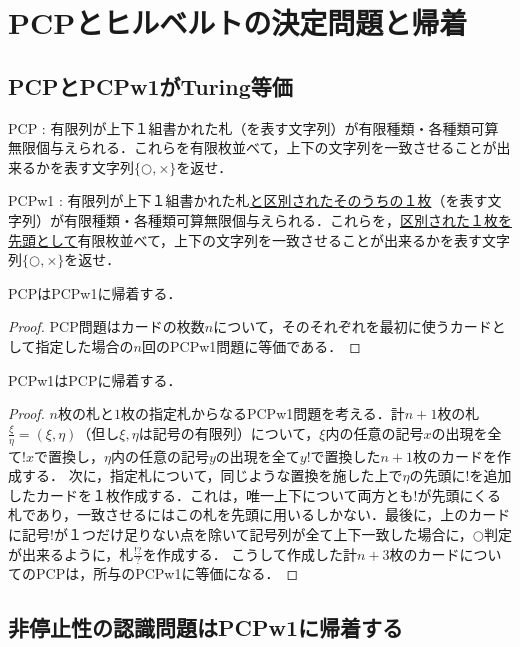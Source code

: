 \documentclass[uplatex, dvipdfmx]{jsreport}
\begin{document}
\section{PCPとヒルベルトの決定問題と帰着}

\subsection{PCPとPCPw1がTuring等価}
\begin{screen}
    PCP : 有限列が上下１組書かれた札（を表す文字列）が有限種類・各種類可算無限個与えられる．これらを有限枚並べて，上下の文字列を一致させることが出来るかを表す文字列$\{\bigcirc,\times\}$を返せ．

    PCPw1 : 有限列が上下１組書かれた札\underline{と区別されたそのうちの１枚}（を表す文字列）が有限種類・各種類可算無限個与えられる．これらを，\underline{区別された１枚を先頭として}有限枚並べて，上下の文字列を一致させることが出来るかを表す文字列$\{\bigcirc,\times\}$を返せ．
\end{screen}

\begin{proposition}
    PCPはPCPw1に帰着する．
\end{proposition}
\begin{proof}
    PCP問題はカードの枚数$n$について，そのそれぞれを最初に使うカードとして指定した場合の$n$回のPCPw1問題に等価である．
\end{proof}

\begin{proposition}
    PCPw1はPCPに帰着する．
\end{proposition}
\begin{proof}
    $n$枚の札と$1$枚の指定札からなるPCPw1問題を考える．計$n+1$枚の札$\frac{\xi}{\eta}=(\xi,\eta)$（但し$\xi,\eta$は記号の有限列）について，$\xi$内の任意の記号$x$の出現を全て$!x$で置換し，$\eta$内の任意の記号$y$の出現を全て$y!$で置換した$n+1$枚のカードを作成する．
    次に，指定札について，同じような置換を施した上で$\eta$の先頭に$!$を追加したカードを１枚作成する．これは，唯一上下について両方とも$!$が先頭にくる札であり，一致させるにはこの札を先頭に用いるしかない．最後に，上のカードに記号$!$が１つだけ足りない点を除いて記号列が全て上下一致した場合に，$\bigcirc$判定が出来るように，札$\frac{!?}{?}$を作成する．
    こうして作成した計$n+3$枚のカードについてのPCPは，所与のPCPw1に等価になる．
\end{proof}

\subsection{非停止性の認識問題はPCPw1に帰着する}
\end{document}
